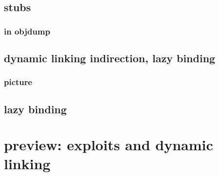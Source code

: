

\subsection{stubs}


\subsubsection{in objdump}


\subsection{dynamic linking indirection, lazy binding}
\subsubsection{picture}




\subsection{lazy binding}


\section{preview: exploits and dynamic linking}

